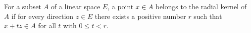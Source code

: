 For a subset $A$ of a linear space $E$, a point $x \in A$ belongs to the radial kernel of $A$ if for every direction $z \in E$ there exists a positive number $r$ such that $x + tz \in A$ for all $t$ with $0 \leq t < r$.

